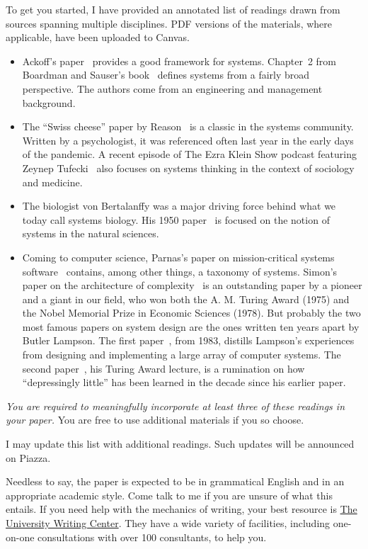 \documentclass[11pt]{article}
\begin{document}
To get you started,
I have provided an annotated list of readings drawn from sources spanning multiple disciplines.
PDF versions of the materials,
where applicable,
have been uploaded to Canvas.
\begin{itemize}
\item 
Ackoff's paper~\cite{ackoff:1994} provides a good framework for systems.
Chapter~2 from Boardman and Sauser's book~\cite{boardman:sauser:2008} defines systems from a fairly broad perspective.
The authors come from an engineering and management background.
\item
The ``Swiss cheese'' paper by Reason~\cite{reason:2000} is a classic in the systems community.
Written by a psychologist,
it was referenced often last year in the early days of the pandemic.
A recent episode of The Ezra Klein Show podcast featuring Zeynep Tufecki~\cite{klein:2021} also focuses on systems thinking 
in the context of sociology and medicine.
\item
The biologist {v}on Bertalanffy was a major driving force behind what we today call systems biology.
His 1950 paper~\cite{vonBertalanffy:1950} is focused on the notion of systems in the natural sciences.
\item
Coming to computer science,
Parnas's paper on mission-critical systems software~\cite{parnas:1985} contains,
among other things,
a taxonomy of systems.
Simon's paper on the architecture of complexity~\cite{simon:1962} is an outstanding paper by a pioneer and a giant in our field, 
who won both the A. M. Turing Award (1975) and the Nobel Memorial Prize in Economic Sciences (1978).
But probably the two most famous papers on system design are the ones written ten years apart by Butler Lampson.
The first paper~\cite{lampson:1983},
from 1983,
distills Lampson's experiences from designing and implementing a large array of computer systems.
The second paper~\cite{lampson:1992},
his Turing Award lecture,
is a rumination on how ``depressingly little'' has been learned in the decade since his earlier paper.
\end{itemize}

\emph{You are required to meaningfully incorporate at least three of these readings in your paper.}
You are free to use additional materials if you so choose.

I may update this list with additional readings.
Such updates will be announced on Piazza.

Needless to say,
the paper is expected to be in grammatical English and in an appropriate academic style.
Come talk to me if you are unsure of what this entails.
If you need help with the mechanics of writing,
your best resource is \href{http://uwc.utexas.edu/}{The University Writing Center}.
They have a wide variety of facilities,
including one-on-one consultations with over 100 consultants,
to help you.
\end{document}
